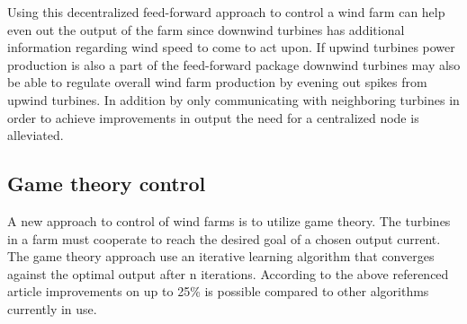 Using this decentralized feed-forward approach to control a wind farm can help even out the output of the farm since downwind turbines has additional information regarding wind speed to come to act upon. If upwind turbines power production is also a part of the feed-forward package downwind turbines may also be able to regulate overall wind farm production by evening out spikes from upwind turbines.
In addition by only communicating with neighboring turbines in order to achieve improvements in output the need for a centralized node is alleviated.

\subsection{Game theory control}
A new approach to control of wind farms is to utilize game theory\cite{AModelFreeApproachToWindFarmControl}.
The turbines in a farm must cooperate to reach the desired goal of a chosen output current.
The game theory approach use an iterative learning algorithm that converges against the optimal output after n iterations.
According to the above referenced article improvements on up to 25\% is possible compared to other algorithms currently in use.